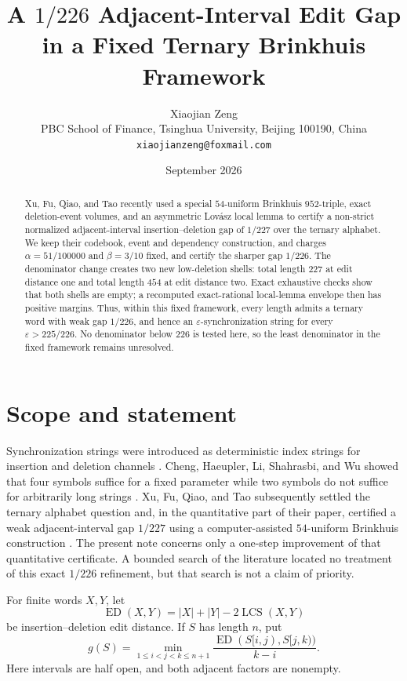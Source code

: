\documentclass[11pt]{article}
\title{A $1/226$ Adjacent-Interval Edit Gap\\
in a Fixed Ternary Brinkhuis Framework}
\author{Xiaojian Zeng\\
\small PBC School of Finance, Tsinghua University, Beijing 100190, China\\
\small \texttt{xiaojianzeng@foxmail.com}}
\date{September 2026}
\newcommand{\ED}{\operatorname{ED}}
\newcommand{\LCS}{\operatorname{LCS}}
\begin{document}
\maketitle

\begin{abstract}
Xu, Fu, Qiao, and Tao recently used a special $54$-uniform Brinkhuis
$952$-triple, exact deletion-event volumes, and an asymmetric Lov\'asz local
lemma to certify a non-strict normalized adjacent-interval
insertion--deletion gap of $1/227$ over the ternary alphabet.  We keep their
codebook, event and dependency construction, and charges
$\alpha=51/100000$ and $\beta=3/10$ fixed, and certify the sharper gap
$1/226$.  The denominator change creates two new low-deletion shells: total
length $227$ at edit distance one and total length $454$ at edit distance
two.  Exact exhaustive checks show that both shells are empty; a recomputed
exact-rational local-lemma envelope then has positive margins.  Thus, within
this fixed framework, every length admits a ternary word with weak gap
$1/226$, and hence an $\varepsilon$-synchronization string for every
$\varepsilon>225/226$.  No denominator below $226$ is tested here, so the
least denominator in the fixed framework remains unresolved.
\end{abstract}

\section{Scope and statement}

Synchronization strings were introduced as deterministic index strings for
insertion and deletion channels \cite{HaeuplerShahrasbi2017}.  Cheng,
Haeupler, Li, Shahrasbi, and Wu showed that four symbols suffice for a fixed
parameter while two symbols do not suffice for arbitrarily long strings
\cite{ChengEtAl2019}.  Xu, Fu, Qiao, and Tao subsequently settled the ternary
alphabet question and, in the quantitative part of their paper, certified a
weak adjacent-interval gap $1/227$ using a computer-assisted $54$-uniform
Brinkhuis construction \cite{XuEtAl2026}.  The present note concerns only a
one-step improvement of that quantitative certificate.  A bounded search of
the literature located no treatment of this exact $1/226$ refinement, but
that search is not a claim of priority.

For finite words $X,Y$, let
\[
  \ED(X,Y)=|X|+|Y|-2\LCS(X,Y)
\]
be insertion--deletion edit distance.  If $S$ has length $n$, put
\[
 g(S)=\min_{1\leq i<j<k\leq n+1}
 \frac{\ED(S[i,j),S[j,k))}{k-i}.
\]
Here intervals are half open, and both adjacent factors are nonempty.
\end{document}

